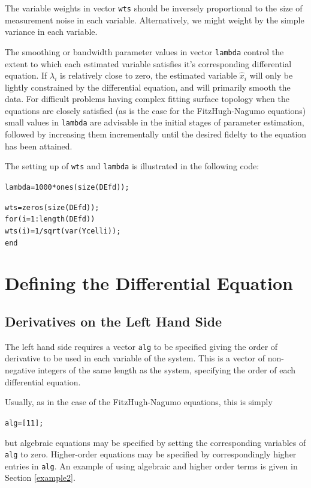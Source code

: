 \documentclass{article}
\newcommand{\nt}    {\noindent}
\begin{document}
The variable weights in vector {\tt wts} should be inversely proportional to the size of
measurement noise in each variable. Alternatively, we might weight by the simple variance in each
variable.

The smoothing or bandwidth parameter values in vector \texttt{lambda} control the extent to which
each estimated variable satisfies it's corresponding differential equation.  If $\lambda_i$ is
relatively close to zero, the estimated variable $\hat{x}_i$ will only be lightly constrained by
the differential equation, and will primarily smooth the data.  For difficult problems having
complex fitting surface topology when the equations are closely satisfied (as is the case for the
FitzHugh-Nagumo equations) small values in \texttt{lambda} are advisable in the initial stages of
parameter estimation, followed by increasing them incrementally until the desired fidelty to the
equation has been attained.

The setting up of \texttt{wts} and \texttt{lambda} is illustrated in the following code:

\begin{alltt}
   lambda = 1000*ones(size(DEfd));

   wts = zeros(size(DEfd));
   for(i = 1:length(DEfd))
     wts(i) = 1/sqrt(var(Ycell{i}));
   end
\end{alltt}

\section{Defining the Differential Equation}

\subsection{Derivatives on the Left Hand Side}

The left hand side requires a vector {\tt alg} to be specified giving the order of derivative to be
used in each variable of the system. This is a vector of non-negative integers of the same length
as the system, specifying the order of each differential equation.

Usually, as in the case of the FitzHugh-Nagumo equations,
this is simply

\begin{alltt}
   alg = [1 1];
\end{alltt}

\nt but algebraic equations may be specified by setting the corresponding variables of {\tt alg} to
zero. Higher-order equations may be specified by correspondingly higher entries in {\tt alg}. An
example of using algebraic and higher order terms is given in Section \ref{example2}.
\end{document}
